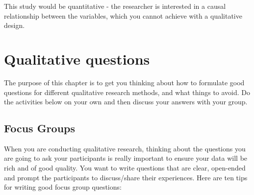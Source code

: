 \documentclass[
  english,
  letterpaper,
  DIV=11,
  numbers=noendperiod]{scrreprt}
\begin{document}
\begin{tcolorbox}[enhanced jigsaw, breakable, bottomtitle=1mm, leftrule=.75mm, opacityback=0, colbacktitle=quarto-callout-caution-color!10!white, opacitybacktitle=0.6, toprule=.15mm, colback=white, left=2mm, coltitle=black, bottomrule=.15mm, titlerule=0mm, title={Explain the answer}, toptitle=1mm, colframe=quarto-callout-caution-color-frame, arc=.35mm, rightrule=.15mm]

This study would be quantitative - the researcher is interested in a
causal relationship between the variables, which you cannot achieve with
a qualitative design.

\end{tcolorbox}

\chapter{Qualitative questions}\label{ch6_qual_questions}

The purpose of this chapter is to get you thinking about how to
formulate good questions for different qualitative research methods, and
what things to avoid. Do the activities below on your own and then
discuss your answers with your group.

\section{Focus Groups}\label{focus-groups}

When you are conducting qualitative research, thinking about the
questions you are going to ask your participants is really important to
ensure your data will be rich and of good quality. You want to write
questions that are clear, open-ended and prompt the participants to
discuss/share their experiences. Here are ten tips for writing good
focus group questions:
\end{document}
